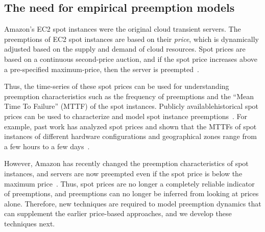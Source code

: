 \subsection{The need for empirical preemption models}
\label{subsec:need-for-empirical}

Amazon's EC2 spot instances were the original cloud transient servers.
The preemptions of EC2 spot instances are based on their \emph{price}, which is dynamically adjusted based on the supply and demand of cloud resources.
Spot prices are based on a continuous second-price auction, and if the spot price increases above a pre-specified maximum-price, then the server is preempted~\cite{spot-pricing2}.

Thus, the time-series of these spot prices can be used for understanding preemption characteristics such as the frequency of preemptions and the ``Mean Time To Failure'' (MTTF) of the spot instances. 
Publicly available\footnotemark historical spot prices can be used to characterize and model spot instance preemptions~\cite{spotcheck,bid-cloud}. %
For example, past work has analyzed spot prices and shown that the MTTFs of spot instances of different hardware configurations and geographical zones range from a few hours to a few days~\cite{prateek-thesis, wolski_probabilistic_2017, icdcs-spotlight}. 



However, Amazon has recently changed the preemption characteristics of spot instances, and servers are now preempted even if the spot price is below the maximum price~\cite{spotweb, bid-change}.
Thus, spot prices are no longer a completely reliable indicator of preemptions, and preemptions can no longer be inferred from looking at prices alone.
Therefore, new techniques are required to model preemption dynamics that can supplement the earlier price-based approaches, and we develop these techniques next.


